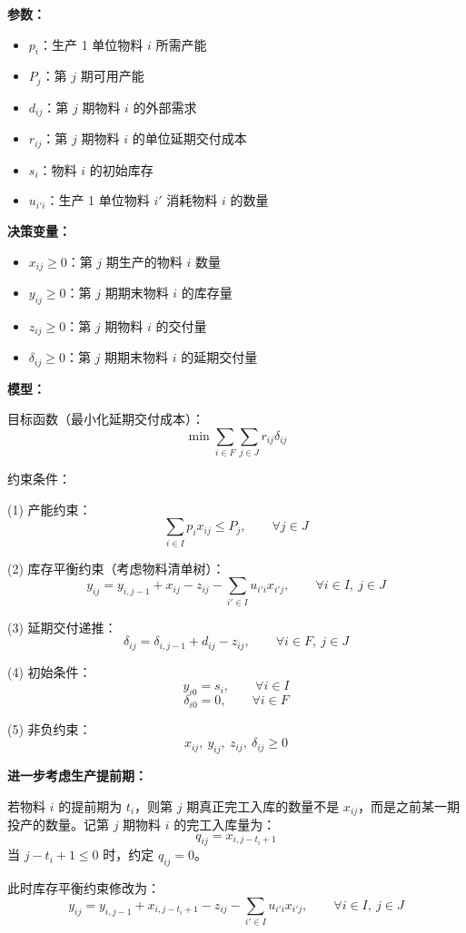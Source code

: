\documentclass[12pt,a4paper]{article}
\begin{document}
\textbf{参数：}
\begin{itemize}
    \item $p_i$：生产 1 单位物料 $i$ 所需产能
    \item $P_j$：第 $j$ 期可用产能
    \item $d_{ij}$：第 $j$ 期物料 $i$ 的外部需求
    \item $r_{ij}$：第 $j$ 期物料 $i$ 的单位延期交付成本
    \item $s_i$：物料 $i$ 的初始库存
    \item $u_{i'i}$：生产 1 单位物料 $i'$ 消耗物料 $i$ 的数量
\end{itemize}

\textbf{决策变量：}
\begin{itemize}
    \item $x_{ij} \ge 0$：第 $j$ 期生产的物料 $i$ 数量
    \item $y_{ij} \ge 0$：第 $j$ 期期末物料 $i$ 的库存量
    \item $z_{ij} \ge 0$：第 $j$ 期物料 $i$ 的交付量
    \item $\delta_{ij} \ge 0$：第 $j$ 期期末物料 $i$ 的延期交付量
\end{itemize}

\textbf{模型：}

目标函数（最小化延期交付成本）：
\[
\min \sum_{i \in F} \sum_{j \in J} r_{ij} \delta_{ij}
\]

约束条件：

(1) 产能约束：
\[
\sum_{i \in I} p_i x_{ij} \le P_j, \qquad \forall j \in J
\]

(2) 库存平衡约束（考虑物料清单树）：
\[
y_{ij} = y_{i,j-1} + x_{ij} - z_{ij} - \sum_{i' \in I} u_{i'i} x_{i'j}, \qquad \forall i \in I,\ j \in J
\]

(3) 延期交付递推：
\[
\delta_{ij} = \delta_{i,j-1} + d_{ij} - z_{ij}, \qquad \forall i \in F,\ j \in J
\]

(4) 初始条件：
\[
y_{i0} = s_i, \qquad \forall i \in I
\]
\[
\delta_{i0} = 0, \qquad \forall i \in F
\]

(5) 非负约束：
\[
x_{ij},\ y_{ij},\ z_{ij},\ \delta_{ij} \ge 0
\]

\textbf{进一步考虑生产提前期：}

若物料 $i$ 的提前期为 $t_i$，则第 $j$ 期真正完工入库的数量不是 $x_{ij}$，而是之前某一期投产的数量。记第 $j$ 期物料 $i$ 的完工入库量为：
\[
q_{ij} = x_{i,j-t_i+1}
\]
当 $j - t_i + 1 \le 0$ 时，约定 $q_{ij} = 0$。

此时库存平衡约束修改为：
\[
y_{ij} = y_{i,j-1} + x_{i,j-t_i+1} - z_{ij} - \sum_{i' \in I} u_{i'i} x_{i'j}, \qquad \forall i \in I,\ j \in J
\]
\end{document}

